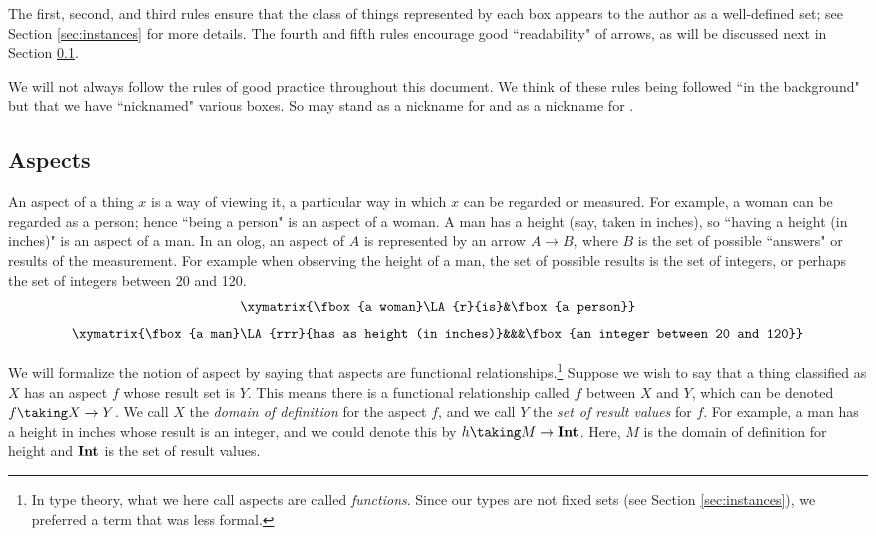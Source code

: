 The first, second, and third rules ensure that the class of things represented by each box appears to the author as a well-defined set; see Section \ref{sec:instances} for more details. The fourth and fifth rules encourage good ``readability" of arrows, as will be discussed next in Section \ref{sec:aspects}. 

We will not always follow the rules of good practice throughout this document. We think of these rules being followed ``in the background" but that we have ``nicknamed" various boxes. So  may stand as a nickname for  and  as a nickname for .

\subsection{Aspects}\label{sec:aspects}

An aspect of a thing $x$ is a way of viewing it, a particular way in which $x$ can be regarded or measured. For example, a woman can be regarded as a person; hence ``being a person" is an aspect of a woman. A man has a height (say, taken in inches), so ``having a height (in inches)" is an aspect of a man. In an olog, an aspect of $A$ is represented by an arrow $A\to B$, where $B$ is the set of possible ``answers" or results of the measurement. For example when observing the height of a man, the set of possible results is the set of integers, or perhaps the set of integers between 20 and 120. \begin{align}\label{dia:aspect 1}\xymatrix{\fbox{a woman}\LA{r}{is}&\fbox{a person}}\end{align}\begin{align}\label{dia:aspect 2}\xymatrix{\fbox{a man}\LA{rrr}{has as height (in inches)}&&&\fbox{an integer between 20 and 120}}\end{align}

We will formalize the notion of aspect by saying that aspects are functional relationships.\footnote{In type theory, what we here call aspects are called {\em functions}. Since our types are not fixed sets (see Section \ref{sec:instances}), we preferred a term that was less formal.} Suppose we wish to say that a thing classified as $X$ has an aspect $f$ whose result set is $Y$.  This means there is a functional relationship called $f$ between $X$ and $Y$, which can be denoted $f\taking X\to Y$.  We call $X$ the {\em domain of definition} for the aspect $f$, and we call $Y$ the {\em set of result values} for $f$. For example, a man has a height in inches whose result is an integer, and we could denote this by $h\taking M\to{\bf Int}$. Here, $M$ is the domain of definition for height and ${\bf Int}$ is the set of result values. 

